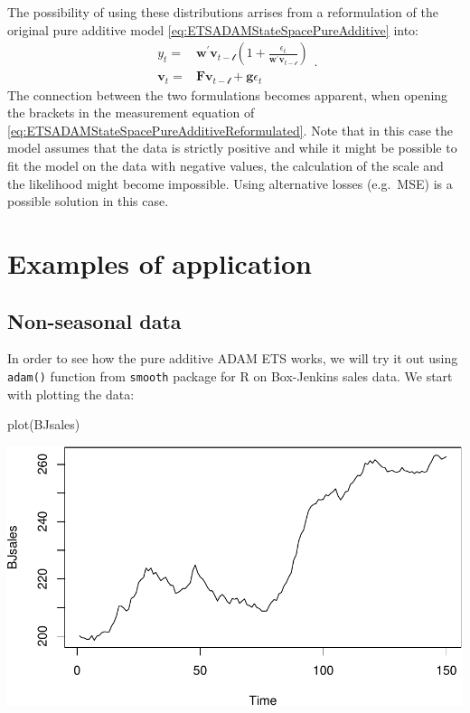 \documentclass[
]{book}
\newenvironment{Shaded}{\begin{snugshade}}{\end{snugshade}}
\newcommand{\FunctionTok}[1]{\textcolor[rgb]{0.00,0.00,0.00}{#1}}
\newcommand{\NormalTok}[1]{#1}
\theoremstyle{definition}
\theoremstyle{definition}
\theoremstyle{definition}
\theoremstyle{definition}
\theoremstyle{remark}
\begin{document}
The possibility of using these distributions arrises from a reformulation of the original pure additive model \eqref{eq:ETSADAMStateSpacePureAdditive} into:
\begin{equation}
  \begin{aligned}
    {y}_{t} = &\mathbf{w}^\prime \mathbf{v}_{t-\boldsymbol{\mathscr{l}}}\left(1 + \frac{\epsilon_t}{\mathbf{w}^\prime \mathbf{v}_{t-\boldsymbol{\mathscr{l}}}}\right) \\
    \mathbf{v}_{t} = &\mathbf{F} \mathbf{v}_{t-\boldsymbol{\mathscr{l}}} + \mathbf{g} \epsilon_t
  \end{aligned}.
  \label{eq:ETSADAMStateSpacePureAdditiveReformulated}
\end{equation}
The connection between the two formulations becomes apparent, when opening the brackets in the measurement equation of \eqref{eq:ETSADAMStateSpacePureAdditiveReformulated}. Note that in this case the model assumes that the data is strictly positive and while it might be possible to fit the model on the data with negative values, the calculation of the scale and the likelihood might become impossible. Using alternative losses (e.g.~MSE) is a possible solution in this case.

\hypertarget{ADAMETSPureAdditiveExamples}{%
\section{Examples of application}\label{ADAMETSPureAdditiveExamples}}

\hypertarget{non-seasonal-data}{%
\subsection{Non-seasonal data}\label{non-seasonal-data}}

In order to see how the pure additive ADAM ETS works, we will try it out using \texttt{adam()} function from \texttt{smooth} package for R on Box-Jenkins sales data. We start with plotting the data:

\begin{Shaded}
\begin{Highlighting}[]
\FunctionTok{plot}\NormalTok{(BJsales)}
\end{Highlighting}
\end{Shaded}

\includegraphics{adam_files/figure-latex/unnamed-chunk-24-1.pdf}
\end{document}
